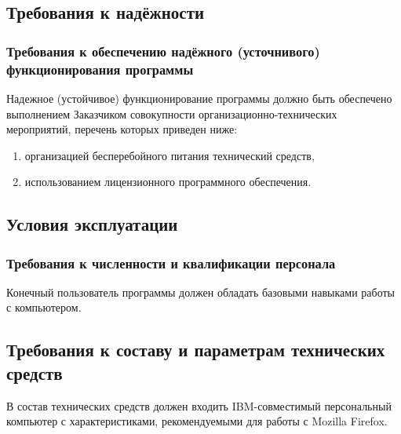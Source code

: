 \documentclass[a4paper,10pt]{article}
\begin{document}
\subsection{Требования к надёжности}
\subsubsection{Требования к обеспечению надёжного (усточнивого) функционирования программы}
Надежное (устойчивое) функционирование программы должно быть обеспечено 
выполнением Заказчиком совокупности организационно-технических мероприятий, 
перечень которых приведен ниже:
\begin{enumerate}
  \item организацией бесперебойного питания технический средств,
  \item использованием лицензионного программного обеспечения.
\end{enumerate}

\subsection{Условия эксплуатации}
\subsubsection{Требования к численности и квалификации персонала}
Конечный пользователь программы должен обладать базовыми навыками работы с компьютером.

\subsection{Требования к составу и параметрам технических средств}
В состав технических средств должен входить IBM-совместимый персональный компьютер 
с характеристиками, рекомендуемыми для работы с Mozilla Firefox.
\end{document}
